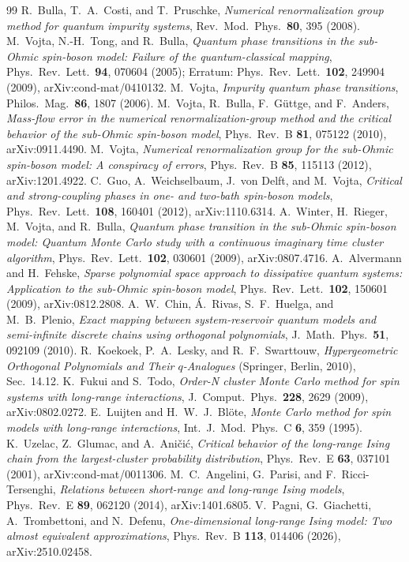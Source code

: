 \documentclass[10pt,a4paper]{article}
\begin{document}
\begin{thebibliography}{99}
 R.~Bulla, T.~A.~Costi, and T.~Pruschke, \emph{Numerical renormalization group method for quantum impurity
  systems}, Rev.\ Mod.\ Phys.\ \textbf{80}, 395 (2008).
 M.~Vojta, N.-H.~Tong, and R.~Bulla, \emph{Quantum phase transitions in the sub-Ohmic spin-boson model: Failure of
  the quantum-classical mapping}, Phys.\ Rev.\ Lett.\ \textbf{94}, 070604 (2005); Erratum: Phys.\ Rev.\ Lett.\ \textbf{102}, 249904
  (2009), arXiv:cond-mat/0410132.
 M.~Vojta, \emph{Impurity quantum phase transitions}, Philos.\ Mag.\ \textbf{86}, 1807 (2006).
 M.~Vojta, R.~Bulla, F.~G\"uttge, and F.~Anders, \emph{Mass-flow error in the numerical renormalization-group
  method and the critical behavior of the sub-Ohmic spin-boson model}, Phys.\ Rev.\ B \textbf{81}, 075122 (2010), arXiv:0911.4490.
 M.~Vojta, \emph{Numerical renormalization group for the sub-Ohmic spin-boson model: A conspiracy of errors},
  Phys.\ Rev.\ B \textbf{85}, 115113 (2012), arXiv:1201.4922.
 C.~Guo, A.~Weichselbaum, J.~von Delft, and M.~Vojta, \emph{Critical and strong-coupling phases in one- and two-bath
  spin-boson models}, Phys.\ Rev.\ Lett.\ \textbf{108}, 160401 (2012), arXiv:1110.6314.
 A.~Winter, H.~Rieger, M.~Vojta, and R.~Bulla, \emph{Quantum phase transition in the sub-Ohmic spin-boson model:
  Quantum Monte Carlo study with a continuous imaginary time cluster algorithm}, Phys.\ Rev.\ Lett.\ \textbf{102}, 030601 (2009),
  arXiv:0807.4716.
 A.~Alvermann and H.~Fehske, \emph{Sparse polynomial space approach to dissipative quantum systems: Application to the
  sub-Ohmic spin-boson model}, Phys.\ Rev.\ Lett.\ \textbf{102}, 150601 (2009), arXiv:0812.2808.
 A.~W.~Chin, \'A.~Rivas, S.~F.~Huelga, and M.~B.~Plenio, \emph{Exact mapping between system-reservoir quantum models
  and semi-infinite discrete chains using orthogonal polynomials}, J.\ Math.\ Phys.\ \textbf{51}, 092109 (2010).
 R.~Koekoek, P.~A.~Lesky, and R.~F.~Swarttouw, \emph{Hypergeometric Orthogonal Polynomials and Their $q$-Analogues}
  (Springer, Berlin, 2010), Sec.~14.12.
 K.~Fukui and S.~Todo, \emph{Order-N cluster Monte Carlo method for spin systems with long-range interactions},
  J.\ Comput.\ Phys.\ \textbf{228}, 2629 (2009), arXiv:0802.0272.
 E.~Luijten and H.~W.~J.~Bl\"ote, \emph{Monte Carlo method for spin models with long-range interactions}, Int.\ J.\ Mod.\
  Phys.\ C \textbf{6}, 359 (1995).
 K.~Uzelac, Z.~Glumac, and A.~Ani\v{c}i\'c, \emph{Critical behavior of the long-range Ising chain from the
  largest-cluster probability distribution}, Phys.\ Rev.\ E \textbf{63}, 037101 (2001), arXiv:cond-mat/0011306.
\bibitem{APR14} M.~C.~Angelini, G.~Parisi, and F.~Ricci-Tersenghi, \emph{Relations between short-range and long-range Ising models},
  Phys.\ Rev.\ E \textbf{89}, 062120 (2014), arXiv:1401.6805.
 V.~Pagni, G.~Giachetti, A.~Trombettoni, and N.~Defenu, \emph{One-dimensional long-range Ising model: Two almost
  equivalent approximations}, Phys.\ Rev.\ B \textbf{113}, 014406 (2026), arXiv:2510.02458.
\end{thebibliography}
\end{document}

